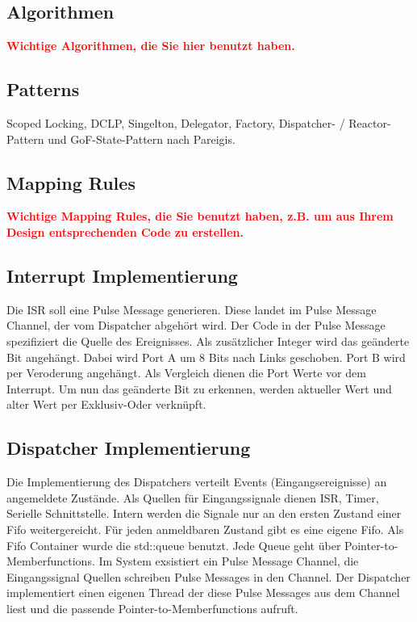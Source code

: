 \documentclass[oneside,a4paper,titlepage]{scrartcl} %
\begin{document}
\subsection{Algorithmen}
\textcolor{red}{\textbf{Wichtige Algorithmen, die Sie hier benutzt haben.}}

\subsection{Patterns}
Scoped Locking, DCLP, Singelton, Delegator, Factory, Dispatcher- / Reactor-Pattern und GoF-State-Pattern nach Pareigis.

\subsection{Mapping Rules}
\textcolor{red}{\textbf{Wichtige Mapping Rules, die Sie benutzt haben, z.B.
um aus Ihrem Design entsprechenden Code zu erstellen.}}

\subsection{Interrupt Implementierung}
Die ISR soll eine Pulse Message generieren. Diese landet im Pulse Message Channel, der vom Dispatcher abgehört wird.
Der Code in der Pulse Message spezifiziert die Quelle des Ereignisses. Als zusätzlicher Integer wird das geänderte Bit angehängt. Dabei wird Port A um 8 Bits nach Links geschoben. Port B wird per Veroderung angehängt. Als Vergleich dienen die Port Werte vor dem Interrupt. Um nun das geänderte Bit zu erkennen, werden aktueller Wert und alter Wert per Exklusiv-Oder verknüpft.
\newpage

\subsection{Dispatcher Implementierung}
Die Implementierung des Dispatchers verteilt Events (Eingangsereignisse) an angemeldete Zustände.
Als Quellen für Eingangssignale dienen ISR, Timer, Serielle Schnittstelle. Intern werden die Signale
nur an den ersten Zustand einer Fifo weitergereicht. Für jeden anmeldbaren Zustand gibt es eine eigene Fifo.
Als Fifo Container wurde die std::queue benutzt. Jede Queue geht über Pointer-to-Memberfunctions.
Im System exsistiert ein Pulse Message Channel, die Eingangssignal Quellen schreiben Pulse Messages in den Channel.
Der Dispatcher implementiert einen eigenen Thread der diese Pulse Messages aus dem Channel liest und die passende
Pointer-to-Memberfunctions aufruft.
\end{document}
